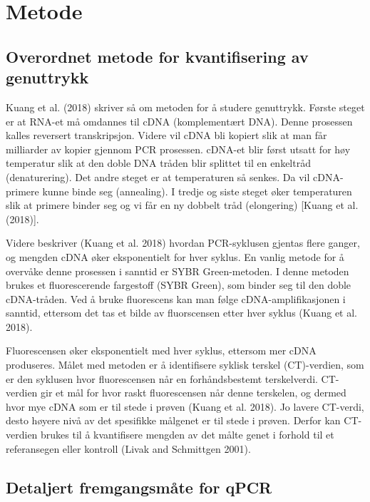 \documentclass[
  letterpaper,
  DIV=11,
  numbers=noendperiod]{scrreprt}
\begin{document}
\section{Metode}\label{metode-6}

\subsection{Overordnet metode for kvantifisering av
genuttrykk}\label{overordnet-metode-for-kvantifisering-av-genuttrykk}

Kuang et al. (2018) skriver så om metoden for å studere genuttrykk.
Første steget er at RNA-et må omdannes til cDNA (komplementært DNA).
Denne prosessen kalles reversert transkripsjon. Videre vil cDNA bli
kopiert slik at man får milliarder av kopier gjennom PCR prosessen.
cDNA-et blir først utsatt for høy temperatur slik at den doble DNA
tråden blir splittet til en enkeltråd (denaturering). Det andre steget
er at temperaturen så senkes. Da vil cDNA-primere kunne binde seg
(annealing). I tredje og siste steget øker temperaturen slik at primere
binder seg og vi får en ny dobbelt tråd (elongering) {[}Kuang et al.
(2018){]}.

Videre beskriver (Kuang et al. 2018) hvordan PCR-syklusen gjentas flere
ganger, og mengden cDNA øker eksponentielt for hver syklus. En vanlig
metode for å overvåke denne prosessen i sanntid er SYBR Green-metoden. I
denne metoden brukes et fluorescerende fargestoff (SYBR Green), som
binder seg til den doble cDNA-tråden. Ved å bruke fluorescens kan man
følge cDNA-amplifikasjonen i sanntid, ettersom det tas et bilde av
fluorscensen etter hver syklus (Kuang et al. 2018).

Fluorescensen øker eksponentielt med hver syklus, ettersom mer cDNA
produseres. Målet med metoden er å identifisere syklisk terskel
(CT)-verdien, som er den syklusen hvor fluorescensen når en
forhåndsbestemt terskelverdi. CT-verdien gir et mål for hvor raskt
fluorescensen når denne terskelen, og dermed hvor mye cDNA som er til
stede i prøven (Kuang et al. 2018). Jo lavere CT-verdi, desto høyere
nivå av det spesifikke målgenet er til stede i prøven. Derfor kan
CT-verdien brukes til å kvantifisere mengden av det målte genet i
forhold til et referansegen eller kontroll (Livak and Schmittgen 2001).

\subsection{Detaljert fremgangsmåte for
qPCR}\label{detaljert-fremgangsmuxe5te-for-qpcr}
\end{document}

